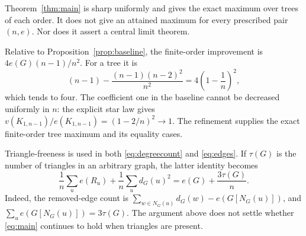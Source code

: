 \documentclass[11pt]{article}
\begin{document}
Theorem~\ref{thm:main} is sharp uniformly and gives the exact maximum over trees of each order. It does not give an attained maximum for every prescribed pair $(n,e)$. Nor does it assert a central limit theorem.

Relative to Proposition~\ref{prop:baseline}, the finite-order improvement is $4e(G)(n-1)/n^2$. For a tree it is
\[
 (n-1)-\frac{(n-1)(n-2)^2}{n^2}=4\left(1-\frac1n\right)^2,
\]
which tends to four. The coefficient one in the baseline cannot be decreased uniformly in $n$: the explicit star law gives $v(K_{1,n-1})/e(K_{1,n-1})=(1-2/n)^2\to1$. The refinement supplies the exact finite-order tree maximum and its equality cases.

Triangle-freeness is used in both \eqref{eq:degreecount} and \eqref{eq:edges}. If $\tau(G)$ is the number of triangles in an arbitrary graph, the latter identity becomes
\[
 \frac1n\sum_u e(R_u)+\frac1n\sum_u d_G(u)^2
 =e(G)+\frac{3\tau(G)}n.
\]
Indeed, the removed-edge count is $\sum_{w\in N_G(u)}d_G(w)-e(G[N_G(u)])$, and $\sum_u e(G[N_G(u)])=3\tau(G)$. The argument above does not settle whether \eqref{eq:main} continues to hold when triangles are present.
\end{document}
